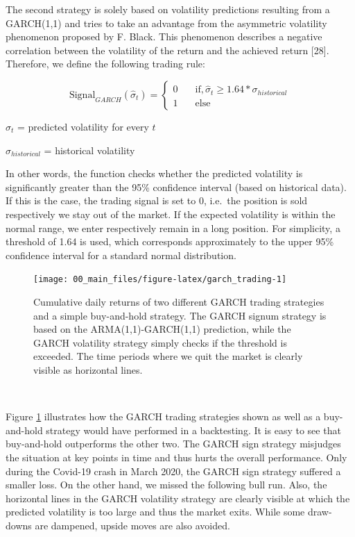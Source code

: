 \documentclass[
]{article}
\begin{document}
The second strategy is solely based on volatility predictions resulting
from a GARCH(1,1) and tries to take an advantage from the asymmetric
volatility phenomenon proposed by F. Black. This phenomenon describes a
negative correlation between the volatility of the return and the
achieved return {[}28{]}. Therefore, we define the following trading
rule:

\begin{equation}\label{eq:vola_predict}
\text{Signal}_{GARCH}(\hat{\sigma}_{t}) =
\begin{cases} 
                                              
  0      & \quad \text{if} ,  \hat{\sigma}_{t} \ge 1.64*\sigma_{historical} \\
  1      & \quad \text{else}

   \end{cases}
\end{equation}

\(\hat{\sigma}_{t}\) = predicted volatility for every \({t}\)

\(\sigma_{historical}\) = historical volatility

In other words, the function checks whether the predicted volatility is
significantly greater than the 95\% confidence interval (based on
historical data). If this is the case, the trading signal is set to 0,
i.e.~the position is sold respectively we stay out of the market. If the
expected volatility is within the normal range, we enter respectively
remain in a long position. For simplicity, a threshold of 1.64 is used,
which corresponds approximately to the upper 95\% confidence interval
for a standard normal distribution.

\newpage

\begin{figure}

{\centering \texttt{[image: 00\_main\_files/figure-latex/garch\_trading-1]} 

}

\caption{Cumulative daily returns of two different GARCH trading strategies and a simple buy-and-hold strategy. The GARCH signum strategy is based on the ARMA(1,1)-GARCH(1,1) prediction, while the GARCH volatility strategy simply checks if the threshold is exceeded. The time periods where we quit the market is clearly visible as horizontal lines.}\label{fig:garch_trading}
\end{figure}

~

Figure \ref{fig:garch_trading} illustrates how the GARCH trading
strategies shown as well as a buy-and-hold strategy would have performed
in a backtesting. It is easy to see that buy-and-hold outperforms the
other two. The GARCH sign strategy misjudges the situation at key points
in time and thus hurts the overall performance. Only during the Covid-19
crash in March 2020, the GARCH sign strategy suffered a smaller loss. On
the other hand, we missed the following bull run. Also, the horizontal
lines in the GARCH volatility strategy are clearly visible at which the
predicted volatility is too large and thus the market exits. While some
draw-downs are dampened, upside moves are also avoided.
\end{document}

